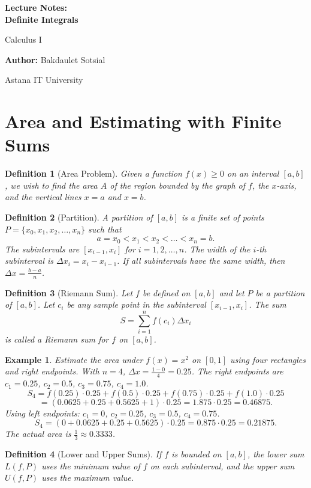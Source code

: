 \documentclass[11pt,a4paper]{article}
\newtheorem{example}{Example}
\newtheorem{definition}{Definition}
\begin{document}
\begin{titlepage}
\centering
\vspace*{4cm}
{\Huge\bfseries Lecture Notes:\\ Definite Integrals\par}
\vspace{1cm}
{\Large Calculus I\par}
\vspace{2cm}
{\large \textbf{Author:} Bakdaulet Sotsial\par}
\vspace{1cm}
\vfill
{\small Astana IT University \par}
\vspace*{2cm}
\end{titlepage}
\tableofcontents
\newpage
\section{Area and Estimating with Finite Sums}
\begin{definition}[Area Problem]
Given a function $f(x) \geq 0$ on an interval $[a, b]$, we wish to find the area $A$ of the region bounded by the graph of $f$, the $x$-axis, and the vertical lines $x = a$ and $x = b$.
\end{definition}
\begin{definition}[Partition]
A \textit{partition} of $[a, b]$ is a finite set of points $P = \{x_0, x_1, x_2, \dots, x_n\}$ such that
\[
a = x_0 < x_1 < x_2 < \dots < x_n = b.
\]
The subintervals are $[x_{i-1}, x_i]$ for $i = 1, 2, \dots, n$. The width of the $i$-th subinterval is $\Delta x_i = x_i - x_{i-1}$. If all subintervals have the same width, then $\Delta x = \frac{b - a}{n}$.
\end{definition}
\begin{definition}[Riemann Sum]
Let $f$ be defined on $[a, b]$ and let $P$ be a partition of $[a, b]$. Let $c_i$ be any sample point in the subinterval $[x_{i-1}, x_i]$. The sum
\[
S = \sum_{i=1}^n f(c_i) \Delta x_i
\]
is called a \textit{Riemann sum} for $f$ on $[a, b]$.
\end{definition}
\begin{example}
Estimate the area under $f(x) = x^2$ on $[0, 1]$ using four rectangles and right endpoints.
With $n = 4$, $\Delta x = \frac{1 - 0}{4} = 0.25$. The right endpoints are $c_1 = 0.25$, $c_2 = 0.5$, $c_3 = 0.75$, $c_4 = 1.0$.
\[
S_4 = f(0.25) \cdot 0.25 + f(0.5) \cdot 0.25 + f(0.75) \cdot 0.25 + f(1.0) \cdot 0.25
\]
\[
= (0.0625 + 0.25 + 0.5625 + 1) \cdot 0.25 = 1.875 \cdot 0.25 = 0.46875.
\]
Using left endpoints: $c_1 = 0$, $c_2 = 0.25$, $c_3 = 0.5$, $c_4 = 0.75$.
\[
S_4 = (0 + 0.0625 + 0.25 + 0.5625) \cdot 0.25 = 0.875 \cdot 0.25 = 0.21875.
\]
The actual area is $\frac{1}{3} \approx 0.3333$.
\end{example}
\begin{definition}[Lower and Upper Sums]
If $f$ is bounded on $[a, b]$, the \textit{lower sum} $L(f, P)$ uses the minimum value of $f$ on each subinterval, and the \textit{upper sum} $U(f, P)$ uses the maximum value.
\end{definition}
\end{document}
